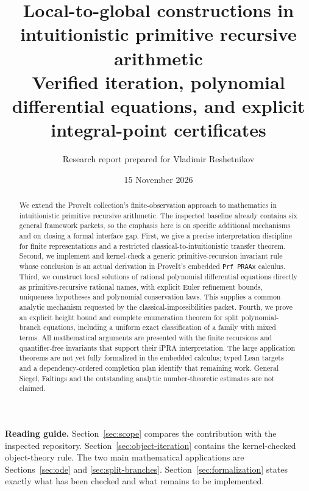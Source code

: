 \documentclass[11pt,a4paper]{article}
\title{Local-to-global constructions in intuitionistic primitive recursive arithmetic\\[5pt]
\large Verified iteration, polynomial differential equations, and explicit integral-point certificates}
\author{Research report prepared for Vladimir Reshetnikov}
\date{15 November 2026}
\theoremstyle{definition}
\theoremstyle{remark}
\newcommand{\code}[1]{\texttt{#1}}
\begin{document}
\maketitle
\begin{abstract}
We extend the ProveIt collection's finite-observation approach to mathematics
in intuitionistic primitive recursive arithmetic. The inspected baseline
already contains six general framework packets, so the emphasis here is on
specific additional mechanisms and on closing a formal interface gap.
First, we give a precise interpretation discipline for finite representations
and a restricted classical-to-intuitionistic transfer theorem. Second, we
implement and kernel-check a generic primitive-recursion invariant rule whose
conclusion is an actual derivation in ProveIt's embedded \code{Prf PRAAx}
calculus. Third, we construct local solutions of rational polynomial
differential equations directly as primitive-recursive rational names, with
explicit Euler refinement bounds, uniqueness hypotheses and polynomial
conservation laws. This supplies a common analytic mechanism requested by
the classical-impossibilities packet. Fourth, we prove an explicit height
bound and complete enumeration theorem for split polynomial-branch equations,
including a uniform exact classification of a family with mixed terms.
All mathematical arguments are presented with the finite recursions and
quantifier-free invariants that support their iPRA interpretation. The large
application theorems are not yet fully formalized in the embedded calculus;
typed Lean targets and a dependency-ordered completion plan identify that
remaining work. General Siegel, Faltings and the outstanding analytic
number-theoretic estimates are not claimed.
\end{abstract}

\noindent\textbf{Reading guide.}
Section~\ref{sec:scope} compares the contribution with the inspected repository.
Section~\ref{sec:object-iteration} contains the kernel-checked object-theory rule.
The two main mathematical applications are Sections~\ref{sec:ode} and
\ref{sec:split-branches}. Section~\ref{sec:formalization} states exactly what
has been checked and what remains to be implemented.

\tableofcontents
\newpage






\appendix


\end{document}
